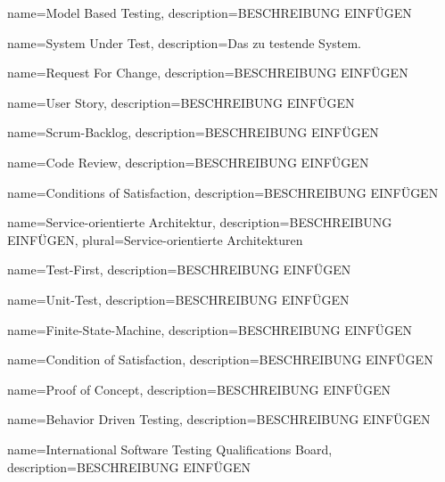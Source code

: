  {
	name={Model Based Testing},
	description={BESCHREIBUNG EINFÜGEN}
}

 {
	name={System Under Test},
	description={Das zu testende System.}
}

 {
	name={Request For Change},
	description={BESCHREIBUNG EINFÜGEN}
}

 {
	name={User Story},
	description={BESCHREIBUNG EINFÜGEN}
}

 {
	name={Scrum-Backlog},
	description={BESCHREIBUNG EINFÜGEN}
}

 {
	name={Code Review},
	description={BESCHREIBUNG EINFÜGEN}
}

 {
	name={Conditions of Satisfaction},
	description={BESCHREIBUNG EINFÜGEN}
}

 {
	name={Service-orientierte Architektur},
	description={BESCHREIBUNG EINFÜGEN},
	plural=Service-orientierte Architekturen
}


 {
	name={Test-First},
	description={BESCHREIBUNG EINFÜGEN}
}

 {
	name={Unit-Test},
	description={BESCHREIBUNG EINFÜGEN}
}

 {
	name={Finite-State-Machine},
	description={BESCHREIBUNG EINFÜGEN}
}

 {
	name={Condition of Satisfaction},
	description={BESCHREIBUNG EINFÜGEN}
}

 {
	name={Proof of Concept},
	description={BESCHREIBUNG EINFÜGEN}
}

 {
	name={Behavior Driven Testing},
	description={BESCHREIBUNG EINFÜGEN}
}

 {
	name={International Software Testing Qualifications Board},
	description={BESCHREIBUNG EINFÜGEN}
}